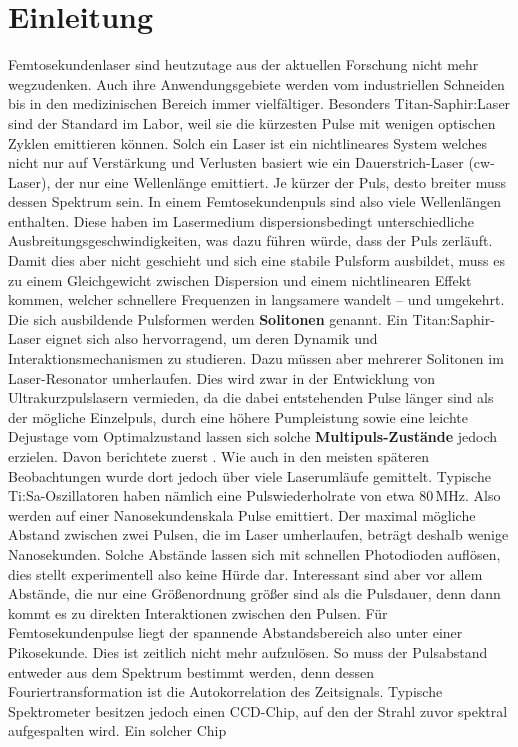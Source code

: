 \documentclass[bachelor,       %
               twoside,        %
               BCOR10mm,       %
               english,ngerman, %
               ]{GAUBM}
\begin{document}
\mainmatter   %

\chapter{Einleitung}
Femtosekundenlaser sind heutzutage aus der aktuellen Forschung nicht mehr wegzudenken.
Auch ihre Anwendungsgebiete werden vom industriellen Schneiden bis in den medizinischen Bereich immer vielfältiger.
Besonders Titan-Saphir:Laser sind der Standard im Labor, weil sie die kürzesten Pulse mit wenigen optischen Zyklen emittieren können.
Solch ein Laser ist ein nichtlineares System welches nicht nur auf Verstärkung und Verlusten basiert wie ein Dauerstrich-Laser (cw-Laser), der nur eine Wellenlänge emittiert.
Je kürzer der Puls, desto breiter muss dessen Spektrum sein.
In einem Femtosekundenpuls sind also viele Wellenlängen enthalten.
Diese haben im Lasermedium dispersionsbedingt unterschiedliche Ausbreitungsgeschwindigkeiten, was dazu führen würde, dass der Puls zerläuft.
Damit dies aber nicht geschieht und sich eine stabile Pulsform ausbildet, muss es zu  einem Gleichgewicht zwischen Dispersion und einem nichtlinearen Effekt kommen, welcher schnellere Frequenzen in langsamere wandelt -- und umgekehrt.
Die sich ausbildende Pulsformen werden \textbf{Solitonen} genannt.
Ein Titan:Saphir-Laser eignet sich also hervorragend, um deren Dynamik und Interaktionsmechanismen zu studieren.
Dazu müssen aber mehrerer Solitonen im Laser-Resonator umherlaufen.
Dies wird zwar in der Entwicklung von Ultrakurzpulslasern vermieden, da die dabei entstehenden Pulse länger sind als der mögliche Einzelpuls, durch eine höhere Pumpleistung sowie eine leichte Dejustage vom Optimalzustand lassen sich solche \textbf{Multipuls-Zustände} jedoch erzielen.
Davon berichtete zuerst \cite{lai_multiple_1997}.
Wie auch in den meisten späteren Beobachtungen wurde dort jedoch über viele Laserumläufe gemittelt.
Typische Ti:Sa-Oszillatoren haben nämlich eine Pulswiederholrate von etwa 80\,MHz.
Also werden auf einer Nanosekundenskala Pulse emittiert.
Der maximal mögliche Abstand zwischen zwei Pulsen, die im Laser umherlaufen, beträgt deshalb wenige Nanosekunden.
Solche Abstände lassen sich mit schnellen Photodioden auflösen, dies stellt experimentell also keine Hürde dar.
Interessant sind aber vor allem Abstände, die nur eine Größenordnung größer sind als die Pulsdauer, denn dann kommt es zu direkten Interaktionen zwischen den Pulsen.
Für Femtosekundenpulse liegt der spannende Abstandsbereich also unter einer Pikosekunde.
Dies ist zeitlich nicht mehr aufzulösen.
So muss der Pulsabstand entweder aus dem Spektrum bestimmt werden, denn dessen Fouriertransformation ist die Autokorrelation des Zeitsignals.
Typische Spektrometer besitzen jedoch einen CCD-Chip, auf den der Strahl zuvor spektral aufgespalten wird.
Ein solcher Chip 
\end{document}
